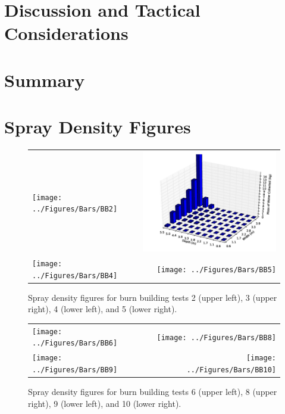 \documentclass[12pt,oneside]{book}
\begin{document}
\chapter{Discussion and Tactical Considerations}
\label{chap:Discussion_and_Tactical_Considerations}

\chapter{Summary}
\label{chap:Summary}



\appendix

\chapter{Spray Density Figures}
\label{app:spray_density}

\begin{figure}[ht]
\begin{tabular*}{\textwidth}{lr}
\texttt{[image: ../Figures/Bars/BB2]} &
\includegraphics[width=3.2in]{../Figures/Bars/BB3} \\
\texttt{[image: ../Figures/Bars/BB4]} &
\texttt{[image: ../Figures/Bars/BB5]}
\end{tabular*}
\caption{Spray density figures for burn building tests 2 (upper left), 3 (upper right), 4 (lower left), and 5 (lower right).}
\label{fig:bb_2_5}
\end{figure}

\clearpage

\begin{figure}[ht]
\begin{tabular*}{\textwidth}{lr}
\texttt{[image: ../Figures/Bars/BB6]} &
\texttt{[image: ../Figures/Bars/BB8]} \\
\texttt{[image: ../Figures/Bars/BB9]} &
\texttt{[image: ../Figures/Bars/BB10]}
\end{tabular*}
\caption{Spray density figures for burn building tests 6 (upper left), 8 (upper right), 9 (lower left), and 10 (lower right).}
\label{fig:bb_6_10}
\end{figure}
\end{document}
